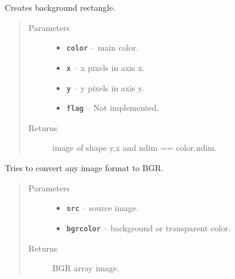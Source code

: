 \documentclass[letterpaper,10pt,english]{sphinxmanual}
\begin{document}

\begin{fulllineitems}
\label{RRtoolbox.lib:RRtoolbox.lib.plotter.background}
Creates background rectangle.
\begin{quote}\begin{description}
\item[{Parameters}] \leavevmode\begin{itemize}
\item {} 
\textbf{\texttt{color}} -- main color.

\item {} 
\textbf{\texttt{x}} -- x pixels in axis x.

\item {} 
\textbf{\texttt{y}} -- y pixels in axis y.

\item {} 
\textbf{\texttt{flag}} -- Not implemented.

\end{itemize}

\item[{Returns}] \leavevmode
image of shape y,x and ndim == color.ndim.

\end{description}\end{quote}

\end{fulllineitems}


\begin{fulllineitems}
\label{RRtoolbox.lib:RRtoolbox.lib.plotter.convert2bgr}
Tries to convert any image format to BGR.
\begin{quote}\begin{description}
\item[{Parameters}] \leavevmode\begin{itemize}
\item {} 
\textbf{\texttt{src}} -- source image.

\item {} 
\textbf{\texttt{bgrcolor}} -- background or transparent color.

\end{itemize}

\item[{Returns}] \leavevmode
BGR array image.

\end{description}\end{quote}

\end{fulllineitems}
\end{document}
